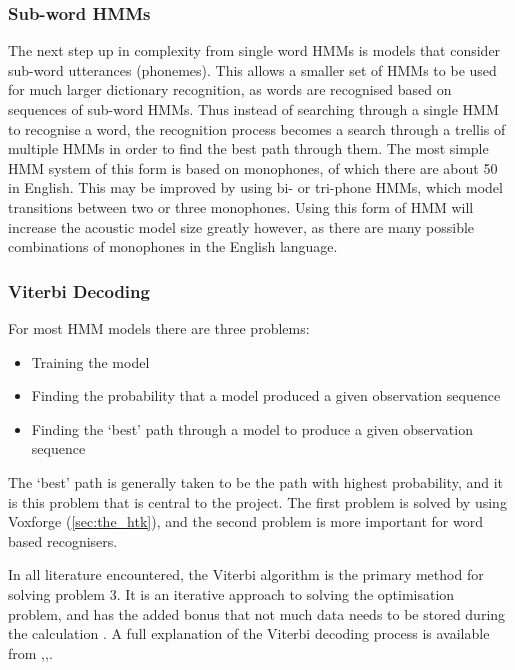 \subsubsection{Sub-word HMMs} %
\label{ssub:sub_word_hmms}
The next step up in complexity from single word HMMs is models that consider sub-word utterances (phonemes).  This allows a smaller set of HMMs to be used for much larger dictionary recognition, as words are recognised based on sequences of sub-word HMMs.  Thus instead of searching through a single HMM to recognise a word, the recognition process becomes a search through a trellis of multiple HMMs in order to find the best path through them.  The most simple HMM system of this form is based on monophones, of which there are about 50 in English.  This may be improved by using bi- or tri-phone HMMs, which model transitions between two or three monophones.  Using this form of HMM will increase the acoustic model size greatly however, as there are many possible combinations of monophones in the English language.

\subsubsection{Viterbi Decoding} %
\label{ssub:viterbi_decoding}
For most HMM models there are three problems: 
\begin{itemize}
	\item Training the model
	\item Finding the probability that a model produced a given observation sequence
	\item Finding the `best' path through a model to produce a given observation sequence
\end{itemize}
The `best' path is generally taken to be the path with highest probability, and it is this problem that is central to the project.  The first problem is solved by using Voxforge (\ref{sec:the_htk}), and the second problem is more important for word based recognisers.

In all literature encountered, the Viterbi algorithm is the primary method for solving problem 3.  It is an iterative approach to solving the optimisation problem, and has the added bonus that not much data needs to be stored during the calculation \cite{schuster2006speech}.  A full explanation of the Viterbi decoding process is available from \cite{rabiner1989tutorial},\cite{melnikoff2003speech},\cite{saeed2008advanced}.

